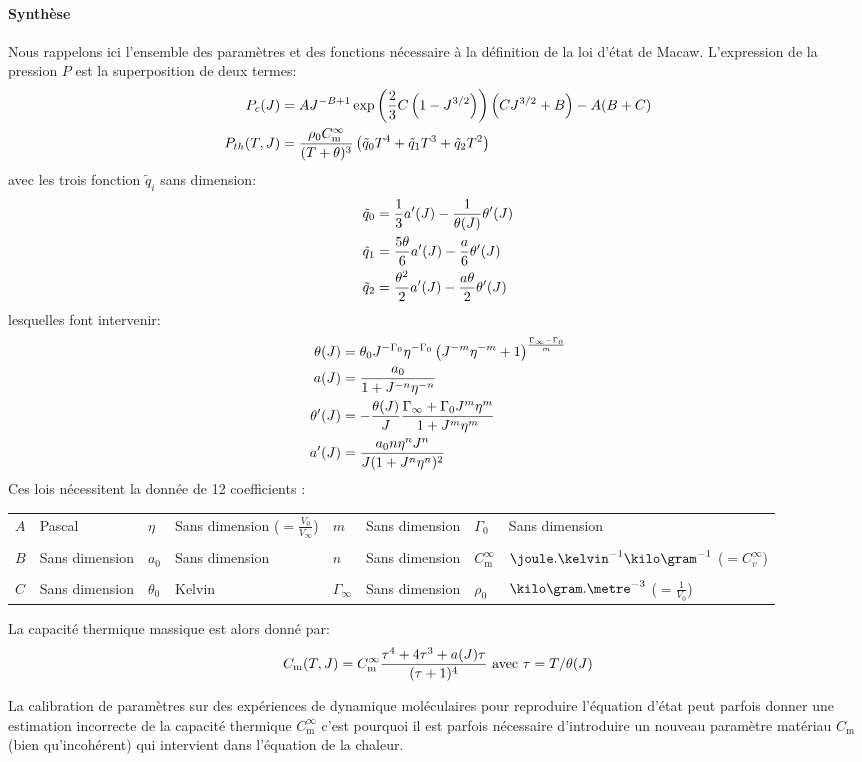 \documentclass[10pt]{book}
\newcommand{\Cm}{C_{\mathrm{m}}}
\begin{document}
\paragraph{Synthèse} Nous rappelons ici l'ensemble des paramètres et des fonctions nécessaire à la définition de la loi d'état de Macaw. L'expression de la pression $P$ est la superposition de deux termes:
$$\begin{aligned}
P_{c}(\J)&=A\J^{-B+1}\exp\left(\dfrac{2}{3}C\left(1-\J^{3/2}\right)\right)\left(C\J^{3/2}+B\right)-A(B+C)\\
P_{th}(T,\J)&=\dfrac{\rho_{0}\Cm^{\infty}}{(T+\theta)^{3}}\left(\tilde{q}_{0}T^{4}+\tilde{q}_{1}T^{3}+\tilde{q}_{2}T^{2}\right)
\end{aligned}$$
avec les trois fonction $\tilde{q}_{i}$ sans dimension:
$$\begin{aligned}
\tilde{q}_{0}&=\dfrac{1}{3}a'(J)-\dfrac{1}{\theta(J)}\theta'(J)\\
\tilde{q}_{1}&=\dfrac{5\theta}{6}a'(J)-\dfrac{a}{6}\theta'(J)\\
\tilde{q}_{2}&=\dfrac{\theta^{2}}{2}a'(J)-\dfrac{a\theta}{2}\theta'(J)\\
\end{aligned}$$
lesquelles font intervenir:
$$\begin{aligned}
\theta(J)&=\theta_{0}J^{-\Gamma_{0}}\eta^{-\Gamma_{0}}\left(J^{-m}\eta^{-m}+1\right)^{\frac{\Gamma_{\infty}-\Gamma_{0}}{m}}\\
a(J)&=\dfrac{a_{0}}{1+J^{-n}\eta^{-n}}\\
\theta'(J)&=-\dfrac{\theta(J)}{J}\dfrac{\Gamma_{\infty}+\Gamma_{0}J^{m}\eta^{m}}{1+J^{m}\eta^{m}}\\
a'(J)&=\dfrac{a_{0}n\eta^{n}J^{n}}{J(1+J^{n}\eta^{n})^{2}}
\end{aligned}$$
Ces lois nécessitent la donnée de 12 coefficients :
\begin{center}
\begin{tabular}{ll|ll|ll|ll}
$A$ & Pascal & $\eta$ & Sans dimension ($=\frac{V_{0}}{V_{\infty}}$) & $m$ & Sans dimension & $\Gamma_{0}$ & Sans dimension\\
&&&&&&&\\
$B$ & Sans dimension & $a_{0}$ & Sans dimension & $n$ & Sans dimension & $\Cm^{\infty}$ & $\joule.\kelvin^{-1}\kilo\gram^{-1}$ ($=C_{v}^{\infty}$)\\
&&&&&&&\\
$C$ & Sans dimension & $\theta_{0}$ & Kelvin & $\Gamma_{\infty}$ & Sans dimension & $\rho_{0}$ & $\kilo\gram.\metre^{-3}$ ($=\frac{1}{V_{0}}$)\\
\end{tabular}
\end{center}
La capacité thermique massique est alors donné par:
$$\Cm(T,\J)=\Cm^{\infty}\dfrac{\tau^{4}+4\tau^{3}+a(\J)\tau}{(\tau+1)^{4}} \avec \tau = T/\theta(\J)$$
\begin{Rem}{La calibration de paramètres sur des expériences de dynamique moléculaires pour reproduire l'équation d'état peut parfois donner une estimation incorrecte de la capacité thermique $\Cm^{\infty}$ c'est pourquoi il est parfois nécessaire d'introduire un nouveau paramètre matériau $\Cm$ (bien qu'incohérent) qui intervient dans l'équation de la chaleur.}\end{Rem}
\end{document}
